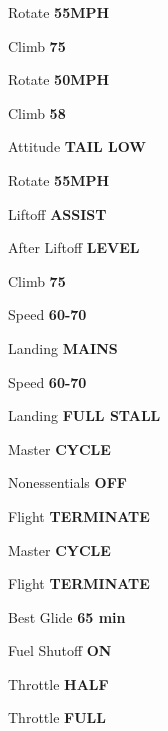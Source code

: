 \documentclass[8pt]{article}
\begin{document}
\begin{multicols*}{3}
Rotate \dotfill \textbf{55MPH}

Climb \dotfill \textbf{75}

\colorbox{cyan!70}{}

Rotate \dotfill \textbf{50MPH}

Climb \dotfill \textbf{58}

\colorbox{cyan!70}{}

Attitude \dotfill \textbf{TAIL LOW}

Rotate \dotfill \textbf{55MPH}

Liftoff \dotfill \textbf{ASSIST}

After Liftoff \dotfill \textbf{LEVEL}

Climb \dotfill \textbf{75}

\colorbox{cyan}{}

\colorbox{cyan!70}{}

Speed \dotfill \textbf{60-70}

Landing \dotfill \textbf{MAINS}

\colorbox{cyan!70}{}

Speed \dotfill \textbf{60-70}

Landing \dotfill \textbf{FULL STALL} \\

\colorbox{yellow!80!orange}{}

Master \dotfill \textbf{CYCLE}

Nonessentials \dotfill \textbf{OFF}

Flight \dotfill \textbf{TERMINATE} \\

\colorbox{yellow!80!orange}{}

Master \dotfill \textbf{CYCLE}

Flight \dotfill \textbf{TERMINATE} \\

\colorbox{red!80}{}

Best Glide \dotfill \textbf{65 min}

Fuel Shutoff \dotfill \textbf{ON}

Throttle \dotfill \textbf{HALF}

Throttle \dotfill \textbf{FULL}


\end{multicols*}
\end{document}
